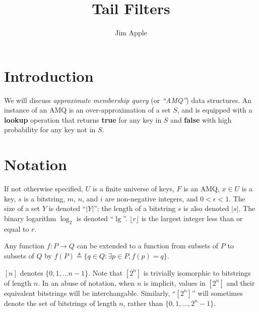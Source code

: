 \documentclass[11pt,letterpaper]{article}
\begin{document}
\title{Tail Filters}
\author{Jim Apple}
\maketitle

\section{Introduction}

We will discuss {\em approximate membership query} (or {\em ``AMQ''}) data structures.
An instance of an AMQ is an over-approximation of a set $S$, and is equipped with a {\bf lookup} operation that returns {\bf true} for any key in $S$ and {\bf false} with high probability for any key not in $S$.

\section{Notation}

If not otherwise specified, $U$ is a finite universe of keys, $F$ is an AMQ, $x \in U$ is a key, $s$ is a bitstring, $m$, $n$, and $i$ are non-negative integers, and $0 < \epsilon < 1$.
The size of a set $Y$ is denoted ``$|Y|$''; the length of a bitstring $s$ is also denoted $|s|$.
The binary logarithm $\log_2$ is denoted ``$\lg$''.
$\lfloor r \rfloor$ is the largest integer less than or equal to $r$.

Any function $f: P \to Q$ can be extended to a function from subsets of $P$ to subsets of $Q$ by $f(P) \triangleq \{ q \in Q: \exists p \in P, f(p) = q\}$.

$[n]$ denotes $\{0, 1, \dots n - 1 \}$.
Note that $[2^n]$ is trivially isomorphic to bitstrings of length $n$.
In an abuse of notation, when $n$ is implicit, values in $[2^n]$ and their equivalent bitstrings will be interchangable.
Similarly, ``$[2^n]$'' will sometimes denote the set of bitstrings of length $n$, rather than $\{0, 1, \dots, 2^n - 1\}$.


\end{document}
